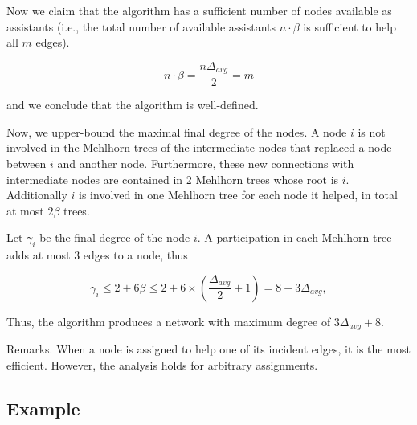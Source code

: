\documentclass{article}
\begin{document}
\medskip

Now we claim that the algorithm has a sufficient number of nodes available as assistants
 (i.e., the total number of available assistants $n \cdot \beta$ is sufficient to help all $m$ edges).

  $$n \cdot \beta = \frac{n\Delta_{avg}}{2} = m$$

and we conclude that the algorithm is well-defined.

\medskip

Now, we upper-bound the maximal final degree of the nodes.
A node $i$ is not involved in the Mehlhorn trees of the intermediate nodes
that replaced a node between $i$ and another node.
Furthermore, these new connections with intermediate nodes are contained in 2 Mehlhorn trees
whose root is $i$. Additionally $i$ is involved in one Mehlhorn tree
for each node it helped, in total at most $2\beta$ trees.

Let $\gamma_i$ be the final degree of the node $i$.
A participation in each Mehlhorn tree adds at most $3$ edges to a node, thus

$$\gamma_i \leq 2 + 6\beta \leq 2 + 6 \times \left(\frac{\Delta_{avg}}{2}+1\right) = 8 + 3\Delta_{avg},$$

Thus, the algorithm produces a network
with maximum degree of $3\Delta_{avg} + 8$.

Remarks.
When a node is assigned to help one of its incident edges, it is the most efficient.
However, the analysis holds for arbitrary assignments.

\newpage

\subsection{Example}
\end{document}
